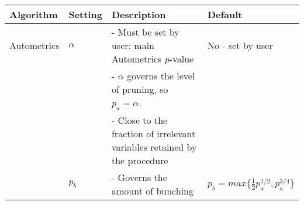 \begin{landscape}
\begin{table}[]
\centering

\begin{tabular}{p{2cm} | p{3 cm}| p{11cm}| p{4cm}}
\textbf{Algorithm} & \textbf{Setting}                                   & \textbf{Description}                                                                                                                                                                    & \textbf{Default}                                   \\
\hline
\hline
Autometrics        & $\alpha$                                           & - Must be set by user: main Autometrics $p$-value                                                                                                                                                                     & No - set by user                                   \\
                   &                                                    & - $\alpha$ governs the level of pruning, so $p_{a} = \alpha$.                                                                                                                             &                                                    \\
                   &                                                    & - Close to the fraction of irrelevant variables retained by the procedure                                                                                                                 &                                                    \\  \hline 
                   &        $p_{b}$                                        & - Governs the amount of bunching                                                                                                                                                          
                   &$p_{b} = max\{\frac{1}{2}p_{a}^{1/2},p_{a}^{3/4}\}$  \\
                 
                   
                   

\end{tabular}
\end{table}
\end{landscape}

